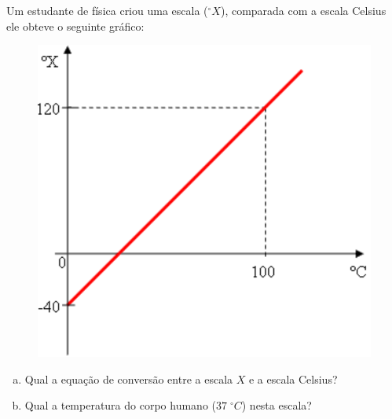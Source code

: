 %
%
    Um estudante de física criou uma escala ($^\circ X$), comparada com a escala Celsius ele obteve o seguinte gráfico:
    \begin{figure}[ht]
        \centering
        \includegraphics[scale=0.3]{graph1.pdf}
        \label{fig:graphterm1}
    \end{figure}
    \begin{enumerate}[a)]
        \item Qual a equação de conversão entre a escala $X$ e a escala Celsius?
        \item Qual a temperatura do corpo humano ($37\;^\circ C$) nesta escala?
    \end{enumerate}

